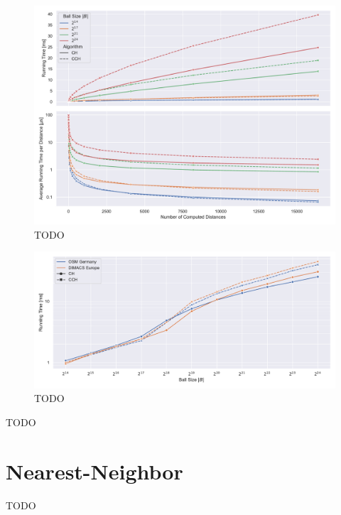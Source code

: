 \documentclass[a4paper, english, cleveref]{lipics-v2021}
\begin{document}
\begin{figure}
\centering
\includegraphics[width=\linewidth]{fig/lazy_rphast_inc.pdf}
\caption{
TODO
}\label{fig:inc_ch_vs_cch}
\end{figure}

\begin{figure}
\centering
\includegraphics[width=\linewidth]{fig/lazy_rphast_many_to_one_both.pdf}
\caption{
TODO
}\label{fig:many_to_one_ch_vs_cch}
\end{figure}

\begin{table}
\setlength{\tabcolsep}{3pt}
\centering
\caption{
TODO
}\label{tab:cchpot_ops}

\end{table}

\section{Nearest-Neighbor}

\begin{table}
\setlength{\tabcolsep}{3pt}
\centering
\caption{
TODO
}\label{tab:knn_overview_table}

\end{table}
\end{document}
